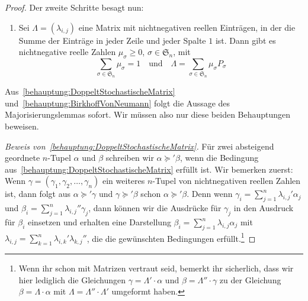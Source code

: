 \begin{proof}
	Der zweite Schritte besagt nun:
	\begin{enumerate}[resume,label=\textup{(\arabic*)},ref=\textup{(\arabic*)}]\itshape
		\item Sei $\Lambda=(\lambda_{i,j})$ eine Matrix mit nichtnegativen reellen Einträgen, in der die Summe der Einträge in jeder Zeile und jeder Spalte $1$ ist. Dann gibt es nichtnegative reelle Zahlen $\mu_\sigma\geqslant 0$, $\sigma\in\mathfrak S_n$, mit\label{behauptung:BirkhoffVonNeumann}
		\begin{equation*}
			\sum_{\sigma\in\mathfrak S_n}\mu_\sigma=1\quad\text{und}\quad \Lambda=\sum_{\sigma\in\mathfrak S_n}\mu_\sigma P_\sigma
		\end{equation*}
	\end{enumerate}
	Aus~\ref{behauptung:DoppeltStochastischeMatrix} und~\ref{behauptung:BirkhoffVonNeumann} folgt die Aussage des Majorisierungslemmas sofort. Wir müssen also nur diese beiden Behauptungen beweisen.
	
	\emph{Beweis von~\ref{behauptung:DoppeltStochastischeMatrix}.} Für zwei absteigend geordnete $n$-Tupel $\alpha$ und $\beta$ schreiben wir $\alpha\succcurlyeq'\beta$, wenn die Bedingung aus~\ref{behauptung:DoppeltStochastischeMatrix} erfüllt ist. Wir bemerken zuerst: Wenn $\gamma=(\gamma_1,\gamma_2,\dotsc,\gamma_n)$ ein weiteres $n$-Tupel von nichtnegativen reellen Zahlen ist, dann folgt aus $\alpha\succcurlyeq'\gamma$ und $\gamma\succcurlyeq'\beta$ schon $\alpha\succcurlyeq' \beta$. Denn wenn $\gamma_i=\sum_{j=1}^n\lambda_{i,j}'\alpha_j$ und $\beta_i=\sum_{j=1}^n\lambda_{i,j}''\gamma_j$, dann können wir die Ausdrücke für $\gamma_j$ in den Ausdruck für $\beta_i$ einsetzen und erhalten eine Darstellung $\beta_i=\sum_{j=1}^n\lambda_{i,j}\alpha_j$ mit $\lambda_{i,j}=\sum_{k=1}^n\lambda_{i,k}'\lambda_{k,j}''$, die die gewünschten Bedingungen erfüllt.\footnote{Wenn ihr schon mit Matrizen vertraut seid, bemerkt ihr sicherlich, dass wir hier lediglich die Gleichungen $\gamma=\Lambda'\cdot \alpha$ und $\beta=\Lambda''\cdot \gamma$ zu der Gleichung $\beta=\Lambda\cdot \alpha$ mit $\Lambda=\Lambda''\cdot\Lambda'$ umgeformt haben.}
	

\end{proof}
